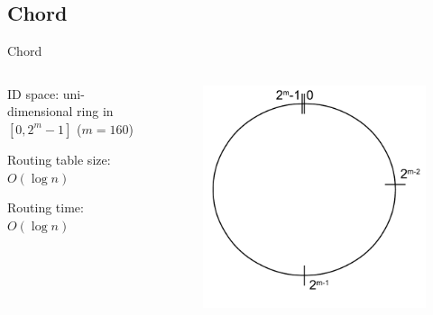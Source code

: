\subsection{Chord}

\begin{frame}{Chord}

\begin{columns}
\begin{column}{0.72\textwidth}
\BI
\item ID space: uni-dimensional ring in $[0, 2^{m}-1]$ ($m=160$)
\item Routing table size: $O(\log n)$
\item Routing time: $O(\log n)$	
\EI
\end{column}
\begin{column}{0.28\textwidth}
\begin{figure}
\includegraphics[width=1.0\textwidth]{chord-example1}
\end{figure}
\end{column}
\end{columns}

\begin{Bib}
{\scriptsize
{}
}\end{Bib}
	
\end{frame}

